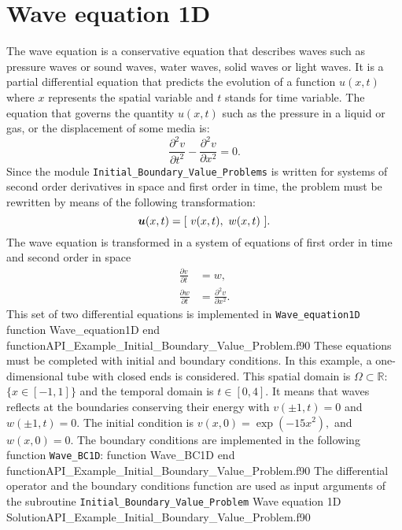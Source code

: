 \section{Wave equation 1D}
The wave equation is a conservative equation that describes waves such as pressure waves or sound waves, water waves, solid waves or light waves. 
It is a partial differential equation that predicts the evolution of a  function $u(x, t)$ where $ x $ represents the spatial variable and  $ t $ stands for time variable. The equation that governs the quantity $u(x,t)$ such as the pressure in a liquid or gas, or the displacement of some media is: 
      \begin{equation*}      	
      \frac{\partial^2 v}{\partial t^2} -  \frac{\partial^2 v}{\partial x^2}  = 0.
      \end{equation*}
Since the module \verb|Initial_Boundary_Value_Problems| is written for systems of second order derivatives in space and first order in time, the problem must be rewritten by means of the following transformation: 
      $$
        \vect{u}(x, t) = [ \ v(x,t), \ w(x,t) \ ]. 
      $$
The wave equation is transformed in a system of equations of first order in time and second order in space     
      \begin{align*}  
      \frac{\partial v}{\partial t} & = w,  \\
      \frac{\partial w}{\partial t} & =  \frac{\partial^2 v}{\partial x^2}. 
      \end{align*}
This set of two differential equations is  implemented in \verb|Wave_equation1D|  
\vspace{0.5cm} 
     {function Wave_equation1D}
     {end function}{API_Example_Initial_Boundary_Value_Problem.f90}      
These equations must be completed with initial and boundary conditions. In this example,  a one-dimensional tube
with closed ends is considered. This spatial domain is $\Omega \subset \mathbb{R} : $ $\{x\in  [-1,1]\}$ and the temporal domain is $t \in [0,4]$.  It means that waves reflects at the boundaries conserving their energy with $v( \pm 1, t) = 0$ and $ w( \pm 1, t) = 0$. 
The initial condition is $  v(x,0)  = \exp(-15 x^2),$ and  $  w(x,0)  = 0.$
The boundary conditions are implemented in the following function \verb|Wave_BC1D|:    
\vspace{0.5cm} 
     {function Wave_BC1D}
     {end function}{API_Example_Initial_Boundary_Value_Problem.f90}      
The differential operator and the boundary conditions function  are used as input arguments of the subroutine \verb|Initial_Boundary_Value_Problem|
\vspace{0.5cm} 
     {Wave equation 1D}
     {Solution}{API_Example_Initial_Boundary_Value_Problem.f90}
     
